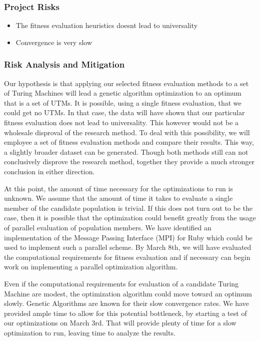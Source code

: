 \subsubsection{Project Risks}
\begin{itemize}
\item The fitness evaluation heuristics doesnt lead to universality
\item Convergence is very slow
\end{itemize}

\subsubsection{Risk Analysis and Mitigation}
Our hypothesis is that applying our selected fitness evaluation methods to a set of Turing Machines will lead a genetic algorithm optimization to an optimum that is a set of UTMs. It is possible, using a single fitness evaluation, that we could get no UTMs. In that case, the data will have shown that our particular fitness evaluation does not lead to universality. This however would not be a wholesale disproval of the research method. To deal with this possibility, we will employee a set of fitness evaluation methods and compare their results. This way, a slightly broader dataset can be generated. Though both methods still can not conclusively disprove the research method, together they provide a much stronger conclusion in either direction. 
    
At this point, the amount of time necessary for the optimizations to run is unknown. We assume that the amount of time it takes to evaluate a single member of the candidate population is trivial. If this does not turn out to be the case, then it is possible that the optimization could benefit greatly from the usage of parallel evaluation of population members. We have identified an implementation of the Message Passing Interface (MPI) for Ruby which could be used to implement such a parallel scheme. By March 8th, we will have evaluated the computational requirements for fitness evaluation and if necessary can begin work on implementing a parallel optimization algorithm.

Even if the computational requirements for evaluation of a candidate Turing Machine are modest, the optimization algorithm could move toward an optimum slowly. Genetic Algorithms are known for their slow convergence rates. We have provided ample time to allow for this potential bottleneck, by starting a test of our optimizations on March 3rd. That will provide plenty of time for a slow optimization to run, leaving time to analyze the results. 

